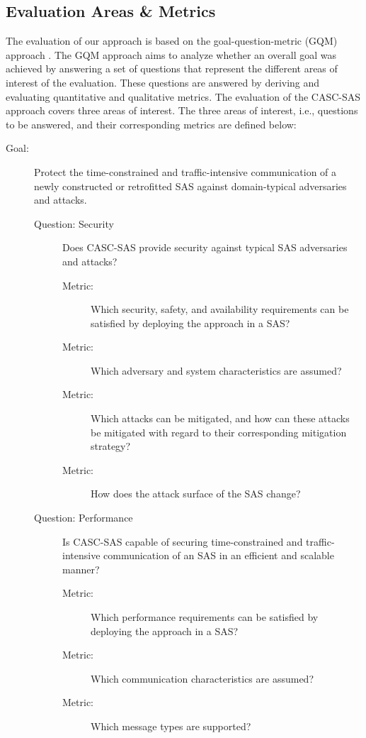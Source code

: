 \subsection{Evaluation Areas \& Metrics}
The evaluation of our approach is based on the goal-question-metric (GQM) approach \cite{Basili84,Basili92}.
The GQM approach aims to analyze whether an overall goal was achieved by answering a set of questions that represent the different areas of interest of the evaluation.
These questions are answered by deriving and evaluating quantitative and qualitative metrics.
The evaluation of the CASC-SAS approach covers three areas of interest.
The three areas of interest, i.e., questions to be answered, and their corresponding metrics are defined below:
\begin{description}
    \item[Goal:] Protect the time-constrained and traffic-intensive communication of a newly constructed or retrofitted SAS against domain-typical adversaries and attacks.
    \begin{description}
        \item[Question: Security] Does CASC-SAS provide security against typical SAS adversaries and attacks?
        \begin{description}
            \item[Metric:] Which security, safety, and availability requirements can be satisfied by deploying the approach in a SAS?
            \item[Metric:] Which adversary and system characteristics are assumed?
            \item[Metric:] Which attacks can be mitigated, and how can these attacks be mitigated with regard to their corresponding mitigation strategy?
            \item[Metric:] How does the attack surface of the SAS change?
        \end{description}
        \item[Question: Performance] Is CASC-SAS capable of securing time-constrained and traffic-intensive communication of an SAS in an efficient and scalable manner?
        \begin{description}
            \item[Metric:] Which performance requirements can be satisfied by deploying the approach in a SAS?
            \item[Metric:] Which communication characteristics are assumed?
            \item[Metric:] Which message types are supported?

\end{description}
\end{description}
\end{description}
